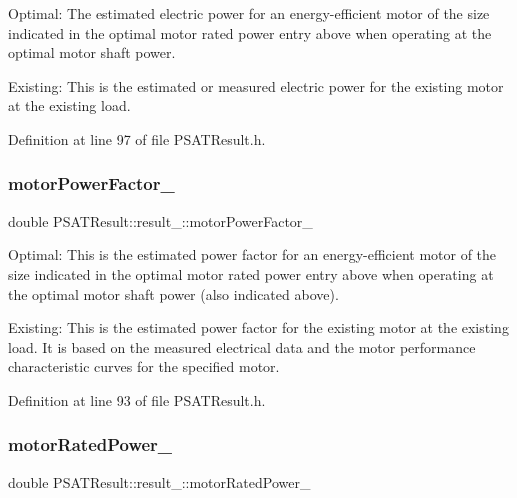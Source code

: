 Optimal\+: The estimated electric power for an energy-\/efficient motor of the size indicated in the optimal motor rated power entry above when operating at the optimal motor shaft power. 

Existing\+: This is the estimated or measured electric power for the existing motor at the existing load. 

Definition at line 97 of file P\+S\+A\+T\+Result.\+h.

\mbox{\label{struct_p_s_a_t_result_1_1result___ad52a7dc3e6841efa64cd202fab047ac3}} 
\subsubsection{\texorpdfstring{motor\+Power\+Factor\+\_\+}{motorPowerFactor\_}}
{\footnotesize\ttfamily double P\+S\+A\+T\+Result\+::result\+\_\+\+::motor\+Power\+Factor\+\_\+}



Optimal\+: This is the estimated power factor for an energy-\/efficient motor of the size indicated in the optimal motor rated power entry above when operating at the optimal motor shaft power (also indicated above). 

Existing\+: This is the estimated power factor for the existing motor at the existing load. It is based on the measured electrical data and the motor performance characteristic curves for the specified motor. 

Definition at line 93 of file P\+S\+A\+T\+Result.\+h.

\mbox{\label{struct_p_s_a_t_result_1_1result___a7debf54d8680536c141a64d758fa5e4b}} 
\subsubsection{\texorpdfstring{motor\+Rated\+Power\+\_\+}{motorRatedPower\_}}
{\footnotesize\ttfamily double P\+S\+A\+T\+Result\+::result\+\_\+\+::motor\+Rated\+Power\+\_\+}



